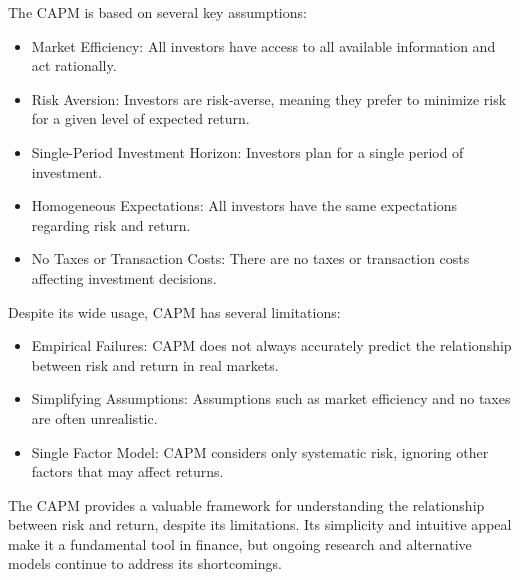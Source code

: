 The CAPM is based on several key assumptions:
\begin{itemize}
    \item Market Efficiency: All investors have access to all available information and act rationally.
    \item Risk Aversion: Investors are risk-averse, meaning they prefer to minimize risk for a given level of expected return.
    \item Single-Period Investment Horizon: Investors plan for a single period of investment.
    \item Homogeneous Expectations: All investors have the same expectations regarding risk and return.
    \item No Taxes or Transaction Costs: There are no taxes or transaction costs affecting investment decisions.
\end{itemize}

Despite its wide usage, CAPM has several limitations:
\begin{itemize}
    \item Empirical Failures: CAPM does not always accurately predict the relationship between risk and return in real markets.
    \item Simplifying Assumptions: Assumptions such as market efficiency and no taxes are often unrealistic.
    \item Single Factor Model: CAPM considers only systematic risk, ignoring other factors that may affect returns.
\end{itemize}

The CAPM provides a valuable framework for understanding the relationship between risk and return, despite its limitations. Its simplicity and intuitive appeal make it a fundamental tool in finance, but ongoing research and alternative models continue to address its shortcomings.





